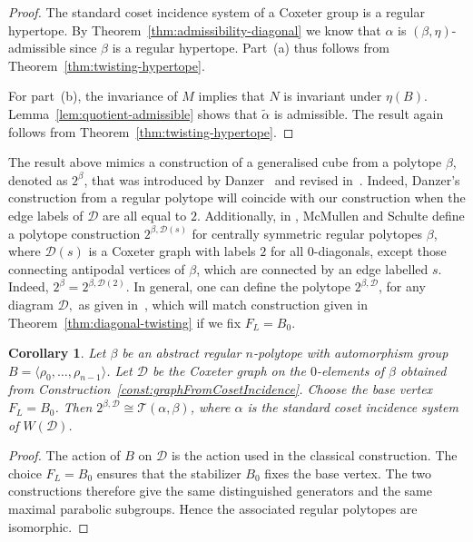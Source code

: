 \documentclass[11pt,letterpaper]{amsart}
\newtheorem{coro}[prop]{Corollary}
\newcommand{\TT}{\mathcal{T}}
\begin{document}
\begin{proof}
The standard coset incidence system of a Coxeter group is a regular hypertope. By Theorem~\ref{thm:admissibility-diagonal} we know that $\alpha$ is $(\beta,\eta)$-admissible since $\beta$ is a regular hypertope. Part~(a) thus follows from Theorem~\ref{thm:twisting-hypertope}.

For part~(b), the invariance of $M$ implies that $N$ is invariant under $\eta(B)$. Lemma~\ref{lem:quotient-admissible} shows that $\widetilde\alpha$ is admissible. The result again follows from Theorem~\ref{thm:twisting-hypertope}.
\end{proof}

The result above mimics a construction of a generalised cube from a polytope $\beta$, denoted as $2^\beta$, that was introduced by Danzer~\cite{danzer_regular_1984} and revised in~\cite[Theorem 8C2]{ARP}. Indeed, Danzer's construction from a regular polytope will coincide with our construction when the edge labels of $\mathcal{D}$ are all equal to $2$.
Additionally, in \cite{ARP}, McMullen and Schulte define a polytope construction $2^{\beta,\mathcal{D}(s)}$ for centrally symmetric regular polytopes $\beta$, where $\mathcal{D}(s)$ is a Coxeter graph with labels $2$ for all $0$-diagonals, except those connecting antipodal vertices of $\beta$, which are connected by an edge labelled $s$. Indeed, $2^\beta = 2^{\beta,\mathcal{D}(2)}$. In general, one can define the polytope $2^{\beta,\mathcal{D}}$, for any diagram $\mathcal{D},$ as given in~\cite[Section~8C]{ARP}, which will match construction given in Theorem~\ref{thm:diagonal-twisting} if we fix $F_L=B_0$.

\begin{coro}\label{coro:twistingGiving2PG}
Let $\beta$ be an abstract regular $n$-polytope with automorphism group
$B=\langle\rho_0,\ldots,\rho_{n-1}\rangle$.
Let $\mathcal{D}$ be the Coxeter graph on the $0$-elements of $\beta$ obtained from Construction~\ref{const:graphFromCosetIncidence}.
Choose the base vertex $F_L=B_0$. Then $2^{\beta,\mathcal{D}}\cong\TT(\alpha,\beta)$,
where $\alpha$ is the standard coset incidence system of $W(\mathcal{D})$.
\end{coro}
\begin{proof}
The action of $B$ on $\mathcal{D}$ is the action used in the classical construction. The choice $F_L=B_0$ ensures that the stabilizer $B_0$ fixes the base vertex. The two constructions therefore give the same distinguished generators and the same maximal parabolic subgroups. Hence the associated regular polytopes are isomorphic.
\end{proof}
\end{document}
